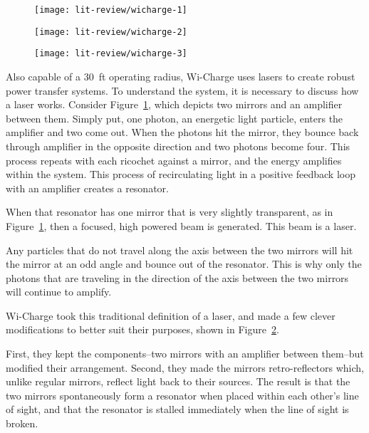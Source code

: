 \begin{figure}[h!]
\centering
\texttt{[image: lit-review/wicharge-1]}
    \caption{}
    \label{fig:lit-review-wicharge-1}
\end{figure}
\begin{figure}[h!]
\centering
\texttt{[image: lit-review/wicharge-2]}
    \caption{}
    \label{fig:lit-review-wicharge-2}
\end{figure}
\begin{figure}[h!]
\centering
\texttt{[image: lit-review/wicharge-3]}
    \caption{}
    \label{fig:lit-review-wicharge-3}
\end{figure}

Also capable of a 30~ft operating radius, Wi-Charge uses lasers to create robust power transfer systems. To understand the system, it is necessary to discuss how a laser works. Consider Figure~\ref{fig:lit-review-wicharge-1}, which depicts two mirrors and an amplifier between them. Simply put, one photon, an energetic light particle, enters the amplifier and two come out. When the photons hit the mirror, they bounce back through amplifier in the opposite direction and two photons become four. This process repeats with each ricochet against a mirror, and the energy amplifies within the system. This process of recirculating light in a positive feedback loop with an amplifier creates a resonator.

When that resonator has one mirror that is very slightly transparent, as in Figure~\ref{fig:lit-review-wicharge-1}, then a focused, high powered beam is generated. This beam is a laser.

Any particles that do not travel along the axis between the two mirrors will hit the mirror at an odd angle and bounce out of the resonator. This is why only the photons that are traveling in the direction of the axis between the two mirrors will continue to amplify.

Wi-Charge took this traditional definition of a laser, and made a few clever modifications to better suit their purposes, shown in Figure~\ref{fig:lit-review-wicharge-2}.

First, they kept the components--two mirrors with an amplifier between them--but modified their arrangement. Second, they made the mirrors retro-reflectors which, unlike regular mirrors, reflect light back to their sources. The result is that the two mirrors spontaneously form a resonator when placed within each other’s line of sight, and that the resonator is stalled immediately when the line of sight is broken.

